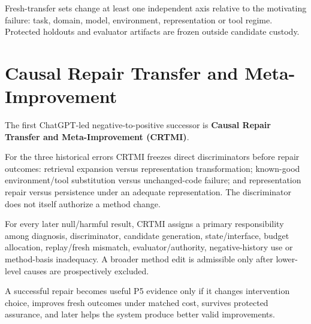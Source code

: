 \documentclass[11pt]{article}
\begin{document}
Fresh-transfer sets change at least one independent axis relative to the motivating failure: task, domain, model, environment, representation or tool regime. Protected holdouts and evaluator artifacts are frozen outside candidate custody.

\section{Causal Repair Transfer and Meta-Improvement}
The first ChatGPT-led negative-to-positive successor is \textbf{Causal Repair Transfer and Meta-Improvement (CRTMI)}.

For the three historical errors CRTMI freezes direct discriminators before repair outcomes: retrieval expansion versus representation transformation; known-good environment/tool substitution versus unchanged-code failure; and representation repair versus persistence under an adequate representation. The discriminator does not itself authorize a method change.

For every later null/harmful result, CRTMI assigns a primary responsibility among diagnosis, discriminator, candidate generation, state/interface, budget allocation, replay/fresh mismatch, evaluator/authority, negative-history use or method-basis inadequacy. A broader method edit is admissible only after lower-level causes are prospectively excluded.

A successful repair becomes useful P5 evidence only if it changes intervention choice, improves fresh outcomes under matched cost, survives protected assurance, and later helps the system produce better valid improvements.
\end{document}
